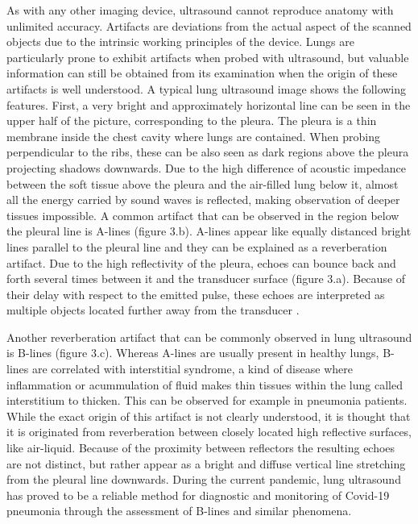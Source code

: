 \documentclass[12pt]{article} %
\begin{document}
	As with any other imaging device, ultrasound cannot reproduce anatomy with unlimited accuracy. Artifacts are deviations from the actual aspect of the scanned objects due to the intrinsic working principles of the device. Lungs are particularly prone to exhibit artifacts when probed with ultrasound, but valuable information can still be obtained from its examination when the origin of these artifacts is well understood. A typical lung ultrasound image shows the following features. First, a very bright and approximately horizontal line can be seen in the upper half of the picture, corresponding to the pleura. The pleura is a thin membrane inside the chest cavity where lungs are contained. When probing perpendicular to the ribs, these can be also seen as dark regions above the pleura projecting shadows downwards. Due to the high difference of acoustic impedance between the soft tissue above the pleura and the air-filled lung below it, almost all the energy carried by sound waves is reflected, making observation of deeper tissues impossible. A common artifact that can be observed in the region below the pleural line is A-lines (figure 3.b). A-lines appear like equally distanced bright lines parallel to the pleural line and they can be explained as a reverberation artifact. Due to the high reflectivity of the pleura, echoes can bounce back and forth several times between it and the transducer surface (figure 3.a). Because of their delay with respect to the emitted pulse, these echoes are interpreted as multiple objects located further away from the transducer \cite{artifacts}.

	
	Another reverberation artifact that can be commonly observed in lung ultrasound is B-lines (figure 3.c). Whereas A-lines are usually present in healthy lungs, B-lines are correlated with interstitial syndrome, a kind of disease where inflammation or acummulation of fluid makes thin tissues within the lung called interstitium to thicken. This can be observed for example in pneumonia patients. While the exact origin of this artifact is not clearly understood, it is thought that it is originated from reverberation between closely located high reflective surfaces, like air-liquid. Because of the proximity between reflectors the resulting echoes are not distinct, but rather appear as a bright and diffuse vertical line stretching from the pleural line downwards. During the current pandemic, lung ultrasound has proved to be a reliable method for diagnostic and monitoring of Covid-19 pneumonia through the assessment of B-lines and similar phenomena.
	
\end{document}
